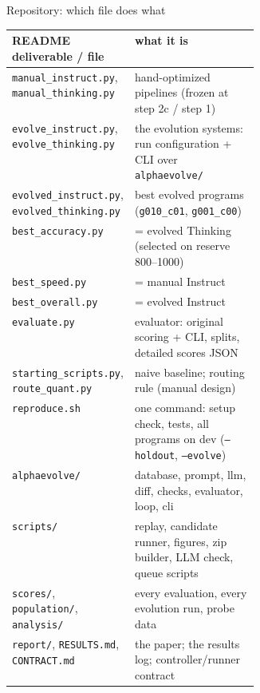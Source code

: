 \documentclass[aspectratio=169,10pt]{beamer}
\newcommand{\file}[1]{\texttt{#1}}
\begin{document}
\begin{frame}{Repository: which file does what}
\scriptsize
\begin{tabularx}{\linewidth}{@{}p{0.36\linewidth}X@{}}
\toprule
README deliverable / file & what it is \\
\midrule
\file{manual\_instruct.py}, \file{manual\_thinking.py} & hand-optimized pipelines (frozen at step 2c / step 1) \\
\file{evolve\_instruct.py}, \file{evolve\_thinking.py} & the evolution systems: run configuration + CLI over \file{alphaevolve/} \\
\file{evolved\_instruct.py}, \file{evolved\_thinking.py} & best evolved programs (\texttt{g010\_c01}, \texttt{g001\_c00}) \\
\file{best\_accuracy.py} & = evolved Thinking (selected on reserve 800--1000) \\
\file{best\_speed.py} & = manual Instruct \\
\file{best\_overall.py} & = evolved Instruct \\
\file{evaluate.py} & evaluator: original scoring + CLI, splits, detailed scores JSON \\
\file{starting\_scripts.py}, \file{route\_quant.py} & naive baseline; routing rule (manual design) \\
\file{reproduce.sh} & one command: setup check, tests, all programs on dev (\texttt{--holdout}, \texttt{--evolve}) \\
\file{alphaevolve/} & database, prompt, llm, diff, checks, evaluator, loop, cli \\
\file{scripts/} & replay, candidate runner, figures, zip builder, LLM check, queue scripts \\
\file{scores/}, \file{population/}, \file{analysis/} & every evaluation, every evolution run, probe data \\
\file{report/}, \file{RESULTS.md}, \file{CONTRACT.md} & the paper; the results log; controller/runner contract \\
\bottomrule
\end{tabularx}
\end{frame}
\end{document}
